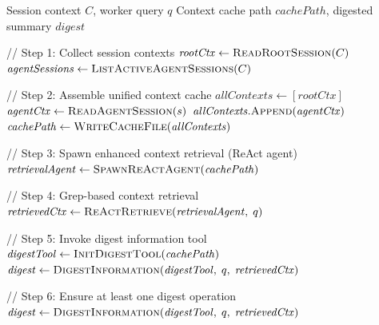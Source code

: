 \documentclass{article}
\begin{document}
\begin{algorithm}[t]
\caption{TINYCUA Information Digester Node}
\label{alg:information-digester}
\begin{algorithmic}[1]
\Require Session context $C$, worker query $q$
\Ensure Context cache path $\mathit{cachePath}$, digested summary $\mathit{digest}$

// Step 1: Collect session contexts
\State $\mathit{rootCtx} \gets \textsc{ReadRootSession}(C)$
\State $\mathit{agentSessions} \gets \textsc{ListActiveAgentSessions}(C)$

// Step 2: Assemble unified context cache
\State $\mathit{allContexts} \gets [\mathit{rootCtx}]$
    \State $\mathit{agentCtx} \gets \textsc{ReadAgentSession}(s)$
    \State $\mathit{allContexts}.\textsc{Append}(\mathit{agentCtx})$
\EndFor
\State $\mathit{cachePath} \gets \textsc{WriteCacheFile}(\mathit{allContexts})$

// Step 3: Spawn enhanced context retrieval (ReAct agent)
\State $\mathit{retrievalAgent} \gets \textsc{SpawnReActAgent}(\mathit{cachePath})$

// Step 4: Grep-based context retrieval
\State $\mathit{retrievedCtx} \gets \textsc{ReActRetrieve}(\mathit{retrievalAgent},\; q)$

// Step 5: Invoke digest information tool
\State $\mathit{digestTool} \gets \textsc{InitDigestTool}(\mathit{cachePath})$
\State $\mathit{digest} \gets \textsc{DigestInformation}(\mathit{digestTool},\; q,\; \mathit{retrievedCtx})$

// Step 6: Ensure at least one digest operation
    \State $\mathit{digest} \gets \textsc{DigestInformation}(\mathit{digestTool},\; q,\; \mathit{retrievedCtx})$
\EndIf

\end{algorithmic}
\end{algorithm}
\end{document}
